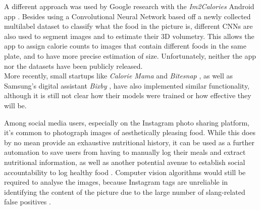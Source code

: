 A different approach was used by Google research with the \textit{Im2Calories} Android app \cite{Myers2015}. Besides using a Convolutional Neural Network based off a newly collected multilabel dataset to classify what the food in the picture is, different CNNs are also used to segment images and to estimate their 3D volumetry. This allows the app to assign calorie counts to images that contain different foods in the same plate, and to have more precise estimation of size. Unfortunately, neither the app nor the datasets have been publicly released.\\
More recently, small startups like \textit{Calorie Mama} \cite{caloriemamaai} and \textit{Bitesnap} \cite{bitesnap}, as well as Samsung's digital assistant \textit{Bixby} \cite{bixbyarticle}, have also implemented similar functionality, although it is still not clear how their models were trained or how effective they will be. 

Among social media users, especially on the Instagram photo sharing platform, it's common to photograph images of aesthetically pleasing food. While this does by no mean provide an exhaustive nutritional history, it can be used as a further automation to save users from having to manually log their meals and extract nutritional information, as well as another potential avenue to establish social accountability to log healthy food \cite{Sharma:2015:MCN:2740908.2742754}. Computer vision algorithms would still be required to analyse the images, because Instagram tags are unreliable in identifying the content of the picture due to the large number of slang-related false positives \cite{hospedales2016}.
